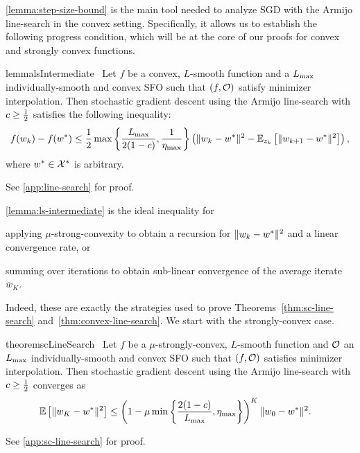\autoref{lemma:step-size-bound} is the main tool needed to analyze \ac{SGD} with the Armijo line-search in the convex setting.
Specifically, it allows us to establish the following progress condition, which will be at the core of our proofs for convex and strongly convex functions. 
\begin{restatable}{lemma}{lsIntermediate}~\label{lemma:ls-intermediate}
    Let \( f \) be a convex, \( L \)-smooth function and \oracle{} a \( \Lmax \) individually-smooth and convex \ac{SFO} such that \( \rbr{f, \oracle{}} \) satisfy minimizer interpolation.
    Then stochastic gradient descent using the Armijo line-search with \( c \geq \half \) satisfies the following
    inequality:
    \[ f(\wk)- f(\wopt) \leq \half \max\cbr{\frac{\Lmax}{2(1-c)},\inv{\etamax}} \rbr{\norm{\wk - \wopt}^2 - \E_{\zk}\sbr{\norm{\wkk - \wopt}^2}}, \]
    where \( \wopt \in \calX^* \) is arbitrary.
\end{restatable}
\noindent See \autoref{app:line-search} for proof. \hfill \break

\autoref{lemma:ls-intermediate} is the ideal inequality for 
\begin{inparaenum}[(a)]
    \item applying \( \mu \)-strong-convexity to obtain a recursion for \( \norm{\wk - \wopt}^2 \) and  a linear convergence rate, or
    \item summing over iterations to obtain sub-linear convergence of the average iterate \( \bar w_K \).
\end{inparaenum}
Indeed, these are exactly the strategies used to prove Theorems~\ref{thm:sc-line-search} and~\ref{thm:convex-line-search}.
We start with the strongly-convex case.

\begin{restatable}{theorem}{scLineSearch}~\label{thm:sc-line-search}
    Let \( f \) be a \( \mu \)-strongly-convex, \( L \)-smooth function and \( \oracle{} \) an \( \Lmax \) individually-smooth and convex \ac{SFO} such that \( \rbr{f, \oracle{}} \) satisfies minimizer interpolation.
    Then stochastic gradient descent using the Armijo line-search with \( c \geq \half \) converges as
    \begin{align*}
        \E\sbr{\norm{\w_{K} - \wopt}^2} &\leq \rbr{1 - \mu \min\cbr{\frac{2(1-c)}{\Lmax}, \etamax}}^K \norm{\w_0 - \wopt}^2. 
    \end{align*}
\end{restatable}%
\noindent See \autoref{app:sc-line-search} for proof. \hfill \break

